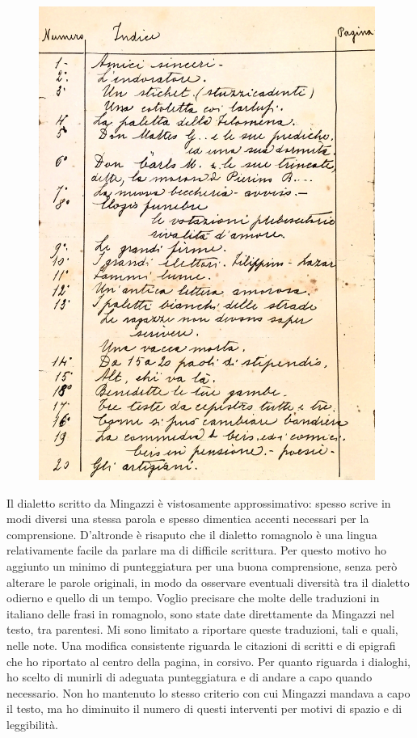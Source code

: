  \begin{figure}[htb]
    \centering
    \vspace{-0.5cm}
    \includegraphics[width=0.98\textwidth]{indice}
    \caption[Indice]{}
    \vspace{-0.4cm}
\end{figure}
\newpage
\noindent Il dialetto scritto da Mingazzi è vistosamente approssimativo: spesso scrive in modi diversi una stessa parola e spesso dimentica accenti necessari per la comprensione. D'altronde è risaputo che il dialetto romagnolo è una lingua relativamente facile da parlare ma di difficile scrittura. Per questo motivo ho aggiunto un minimo di punteggiatura per una buona comprensione, senza però alterare le parole originali, in modo da osservare eventuali diversità tra il dialetto odierno e quello di un tempo. Voglio precisare che molte delle traduzioni in italiano delle frasi in romagnolo, sono state date direttamente da Mingazzi nel testo, tra parentesi. Mi sono limitato a riportare queste traduzioni, tali e quali, nelle note. Una modifica consistente riguarda le citazioni di scritti e di epigrafi che ho riportato al centro della pagina, in corsivo. Per quanto riguarda i dialoghi, ho scelto di munirli di adeguata punteggiatura e di andare a capo quando necessario. Non ho mantenuto lo stesso criterio con cui Mingazzi mandava a capo il testo, ma ho diminuito il numero di questi interventi per motivi di spazio e di leggibilità.	\\\\
